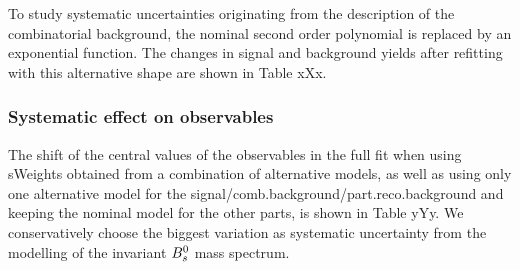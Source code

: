 To study systematic uncertainties originating from the description of the combinatorial background, the nominal second order polynomial is replaced by an exponential function. 
The changes in signal and background yields after refitting with this alternative shape are shown in Table xXx. \newline

\subsubsection{Systematic effect on observables}

The shift of the central values of the observables in the full fit when using sWeights obtained from a combination of alternative models, 
as well as using only one alternative model for the signal/comb.background/part.reco.background and keeping the nominal model for the other parts,
is shown in Table yYy. We conservatively choose the biggest variation as systematic uncertainty from the modelling of the invariant ${{B}^0_{s}}$ mass spectrum.



